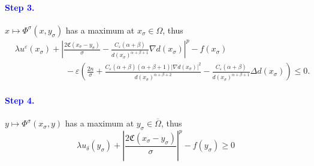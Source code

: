\documentclass[11pt,reqno]{amsart}
\numberwithin{figure}{section}
\theoremstyle{plain}
\theoremstyle{remark}
\numberwithin{equation}{section}
\begin{document}
\paragraph{\textcolor{blue}{\textbf{Step 3.}}} $x\mapsto \Phi^\sigma(x,y_\sigma)$ has a maximum at $x_\sigma\in \Omega$, thus 
\begin{align*}
    &\lambda u^\varepsilon(x_\sigma) + \left|\frac{2\mathfrak{C}(x_\sigma-y_\sigma)}{\sigma} - \frac{C_\varepsilon(\alpha+\beta)}{d(x_\sigma)^{\alpha+\beta+1}}\nabla d(x_\sigma )\right|^p - f(x_\sigma)\\
    &\qquad\qquad\qquad -\varepsilon\left(\frac{2n}{\sigma} + \frac{C_\varepsilon(\alpha+\beta)(\alpha+\beta+1)|\nabla d(x_\sigma)|^2}{d(x_\sigma)^{\alpha+\beta+2}}-\frac{C_\varepsilon(\alpha+\beta)}{d(x_\sigma)^{\alpha+\beta+1}}\Delta d(x_\sigma)\right)  \leq 0.
\end{align*}
\paragraph{\textcolor{blue}{\textbf{Step 4.}}} $y\mapsto \Phi^\sigma(x_\sigma,y)$ has a maximum at $y_\sigma\in \overline{\Omega}$, thus 
\begin{equation*}
    \lambda u_\delta(y_\sigma) + \left|\frac{2\mathfrak{C}(x_\sigma-y_\sigma)}{\sigma}\right|^p - f(y_\sigma) \geq 0
\end{equation*}
\end{document}

